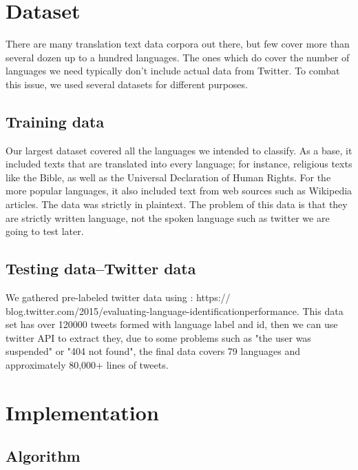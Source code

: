 \documentclass[11pt]{article}
\begin{document}
\section{Dataset}
There are many translation text data corpora out there,
but few cover more than several dozen up to a hundred languages. The ones which do cover the number of languages
we need typically don’t include actual data from Twitter.
To combat this issue, we used several datasets for different
purposes.
\subsection{Training data}
Our largest dataset covered all the languages we intended
to classify. As a base, it included texts that are translated
into every language; for instance, religious texts like
the Bible, as well as the Universal Declaration of Human
Rights. For the more popular languages, it also included text
from web sources such as Wikipedia articles. The data was strictly in plaintext. The problem of this data is that they are strictly written language, not the spoken language such as twitter we are going to test later.
\subsection{Testing data--Twitter data}
We gathered pre-labeled twitter data using : https://
blog.twitter.com/2015/evaluating-language-identificationperformance. This data set has over 120000 tweets formed with language label and id, then we can use twitter API to extract they, due to some problems such as "the user was suspended" or "404 not found", the final data covers 79 languages and approximately 80,000+ lines of tweets.


\section{Implementation}
\subsection{Algorithm}
\end{document}
